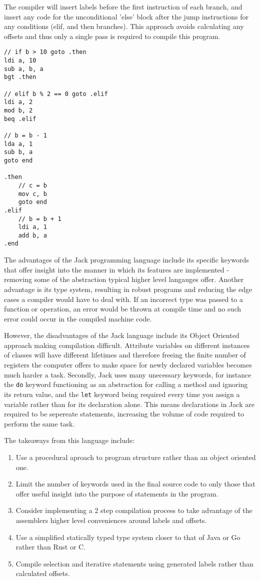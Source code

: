 The compiler will insert labels before the first instruction of each branch, and insert any code for the unconditional 'else' block after the jump instructions for any conditions (elif, and then branches). This approach avoids calculating any offsets and thus only a single pass is required to compile this program.

\begin{lstlisting}
// if b > 10 goto .then
ldi a, 10
sub a, b, a 
bgt .then

// elif b % 2 == 0 goto .elif
ldi a, 2
mod b, 2
beq .elif

// b = b - 1
lda a, 1
sub b, a
goto end

.then
    // c = b
    mov c, b
    goto end
.elif
    // b = b + 1
    ldi a, 1
    add b, a
.end
\end{lstlisting}

The advantages of the Jack programming language include its specific keywords that offer insight into the manner in which its features are implemented - removing some of the abstraction typical higher level langauges offer. Another advantage is its type system, resulting in robust programs and reducing the edge cases a compiler would have to deal with. If an incorrect type was passed to a function or operation, an error would be thrown at compile time and no such error could occur in the compiled machine code.

However, the disadvantages of the Jack language include its Object Oriented approach making compilation difficult. Attribute variables on different instances of classes will have different  lifetimes and therefore freeing the finite number of registers the computer offers to make space for newly declared variables becomes much harder a task. Secondly, Jack uses many unecessary keywords, for instance the \texttt{do} keyword functioning as an abstraction for calling a method and ignoring its return value, and the \texttt{let} keyword being required every time you assign a variable rather than for its declaration alone. This means declarations in Jack are required to be sepereate statements, increasing the volume of code required to perform the same task.

The takeaways from this language include:
\begin{enumerate}
    \item Use a procedural aproach to program structure rather than an object oriented one.
    \item Limit the number of keywords used in the final source code to only those that offer useful insight into the purpose of statements in the program.
    \item Consider implementing a 2 step compilation process to take advantage of the assemblers higher level conveniences around labels and offsets.
    \item Use a simplified statically typed type system closer to that of Java or Go rather than Rust or C.
    \item Compile selection and iterative statements using generated labels rather than calculated offsets.
\end{enumerate}

